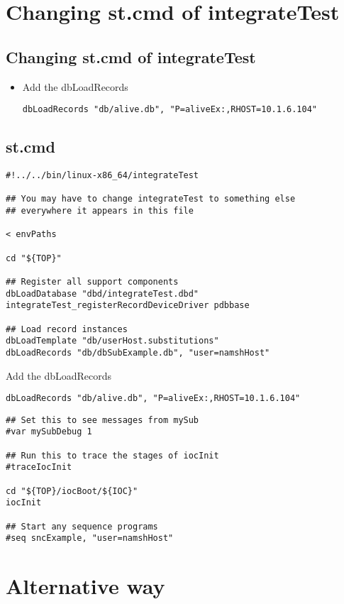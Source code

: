 \documentclass[11pt
  , a4paper
  , article
  , oneside
]{memoir}
\begin{document}
\section{Changing st.cmd of integrateTest}
\subsection{Changing st.cmd of integrateTest}
\begin{itemize}
	\item Add the dbLoadRecords
	\begin{lstlisting}[style=termstyle]
dbLoadRecords "db/alive.db", "P=aliveEx:,RHOST=10.1.6.104"
\end{lstlisting}
\end{itemize}
\subsection{st.cmd}
\begin{lstlisting}[style=termstyle]
#!../../bin/linux-x86_64/integrateTest

## You may have to change integrateTest to something else
## everywhere it appears in this file

< envPaths

cd "${TOP}"

## Register all support components
dbLoadDatabase "dbd/integrateTest.dbd"
integrateTest_registerRecordDeviceDriver pdbbase

## Load record instances
dbLoadTemplate "db/userHost.substitutions"
dbLoadRecords "db/dbSubExample.db", "user=namshHost"
\end{lstlisting}
Add the dbLoadRecords
\begin{lstlisting}[style=termstyle]
dbLoadRecords "db/alive.db", "P=aliveEx:,RHOST=10.1.6.104"
\end{lstlisting}
\begin{lstlisting}[style=termstyle]
## Set this to see messages from mySub
#var mySubDebug 1

## Run this to trace the stages of iocInit
#traceIocInit

cd "${TOP}/iocBoot/${IOC}"
iocInit

## Start any sequence programs
#seq sncExample, "user=namshHost"

\end{lstlisting}
\section{Alternative way}
\end{document}
